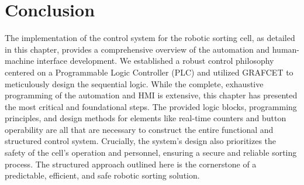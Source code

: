 \section{Conclusion}
The implementation of the control system for the robotic sorting cell, as detailed in this chapter, provides a comprehensive overview of the automation and human-machine interface development. We established a robust control philosophy centered on a Programmable Logic Controller (PLC) and utilized GRAFCET to meticulously design the sequential logic. While the complete, exhaustive programming of the automation and HMI is extensive, this chapter has presented the most critical and foundational steps. The provided logic blocks, programming principles, and design methods for elements like real-time counters and button operability are all that are necessary to construct the entire functional and structured control system. Crucially, the system's design also prioritizes the safety of the cell's operation and personnel, ensuring a secure and reliable sorting process. The structured approach outlined here is the cornerstone of a predictable, efficient, and safe robotic sorting solution.






















